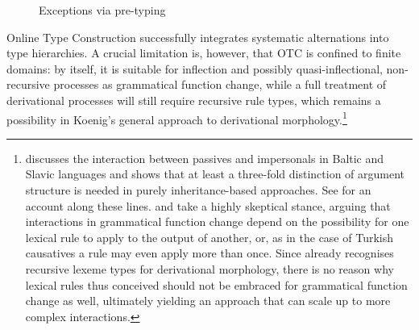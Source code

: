 \documentclass[output=paper
                ,modfonts
                ,nonflat
	        ,collection
	        ,collectionchapter
	        ,collectiontoclongg
 	        ,biblatex
                ,babelshorthands
                ,newtxmath
                ,draftmode
                ,colorlinks, citecolor=brown
]{./langsci/langscibook}
\begin{document}
{\begin{figure}[htb]
  \caption{Exceptions via pre-typing}
  \label{fig:KoenigPre}
\end{figure}




Online Type Construction successfully integrates systematic
alternations into type hierarchies. A crucial limitation is, however,
that OTC is confined to finite domains: by itself, it is suitable for
inflection and possibly quasi-inflectional, non-recursive processes as
grammatical function change, while a full treatment of derivational
processes will still require recursive rule types, which remains a
possibility in Koenig's general approach to derivational
morphology.\footnote{\citet{Blevins2003a} discusses the interaction
  between passives and impersonals in Baltic and Slavic languages and
  shows that at least a three-fold distinction of argument structure
  is needed in purely inheritance-based approaches. See
  \citet{ASU99a-u} for an account along these lines.  and  take a
  highly skeptical stance, arguing that interactions in grammatical
  function change depend on the possibility for one lexical rule to
  apply to the output of another, or, as in the case of Turkish
  causatives a rule may even apply more than once. Since
  \citet{Koenig99} already recognises recursive lexeme types for
  derivational morphology, there is no reason why lexical rules thus
  conceived should not be embraced for grammatical function change as
  well, ultimately yielding an approach that can scale up to more
  complex interactions.  } %

}
\end{document}
